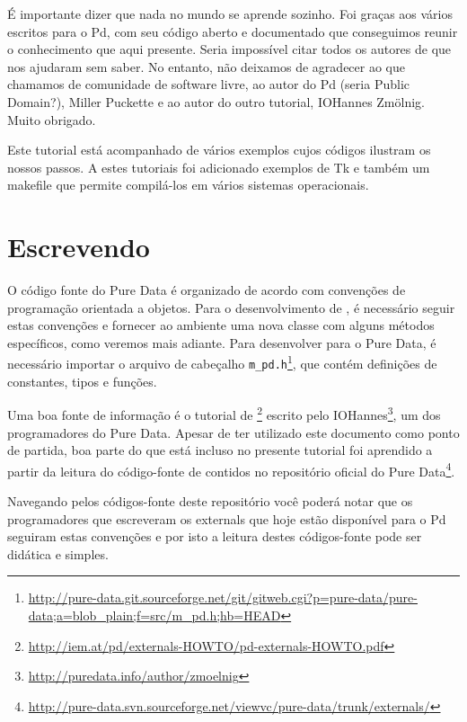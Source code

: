 É importante dizer que nada no mundo se aprende sozinho.
Foi graças aos vários \externals escritos para o Pd, com seu código aberto e
documentado que conseguimos reunir o conhecimento que aqui presente.
Seria impossível citar todos os autores  de \externals que nos ajudaram sem
saber.
No entanto, não deixamos de agradecer ao que chamamos de comunidade de software
livre, ao autor do Pd (seria Public Domain?),  Miller Puckette e ao autor do
outro tutorial, IOHannes Zmölnig.
Muito obrigado.

Este tutorial está acompanhado de vários exemplos cujos códigos ilustram os nossos
passos.
A estes tutoriais foi adicionado exemplos de Tk e também um makefile que
permite compilá-los em vários sistemas operacionais.

\section{Escrevendo \externals}

O código fonte do Pure Data é organizado de acordo com convenções de
programação orientada a objetos.
Para o desenvolvimento de \externals, é necessário seguir estas convenções e
fornecer ao ambiente uma nova classe com alguns métodos específicos, como
veremos mais adiante.
Para desenvolver para o Pure Data, é necessário importar o arquivo de cabeçalho
\texttt{m\_pd.h}\footnote{\url{http://pure-data.git.sourceforge.net/git/gitweb.cgi?p=pure-data/pure-data;a=blob\_plain;f=src/m\_pd.h;hb=HEAD}},
que contém definições de constantes, tipos e funções.

Uma boa fonte de informação é o tutorial de
\externals\footnote{\url{http://iem.at/pd/externals-HOWTO/pd-externals-HOWTO.pdf}}
escrito pelo IOHannes\footnote{\url{http://puredata.info/author/zmoelnig}}, um dos
programadores do Pure Data.
Apesar de ter utilizado este documento como ponto de partida, boa parte do que
está incluso no presente tutorial foi aprendido a partir da leitura do
código-fonte de \externals contidos no repositório oficial do Pure
Data\footnote{\url{http://pure-data.svn.sourceforge.net/viewvc/pure-data/trunk/externals/}}.

Navegando pelos códigos-fonte deste repositório você poderá notar que os programadores
que escreveram os externals que hoje estão disponível para o Pd seguiram estas convenções
e por isto a leitura destes códigos-fonte pode ser didática e simples.

